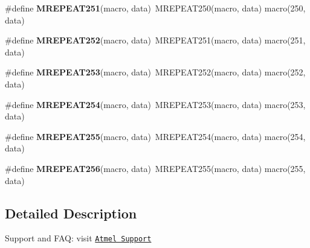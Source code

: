 \begin{DoxyCompactItemize}
\item 
\hypertarget{group__group__xmega__utils__mrepeat_ga1b24f68c1e46baf224a8d05207d768f4}{\#define {\bfseries M\-R\-E\-P\-E\-A\-T251}(macro, data)~M\-R\-E\-P\-E\-A\-T250(macro, data)   macro(250, data)}\label{group__group__xmega__utils__mrepeat_ga1b24f68c1e46baf224a8d05207d768f4}

\item 
\hypertarget{group__group__xmega__utils__mrepeat_ga83ac32e68c09ace0114ad0af4f39b7df}{\#define {\bfseries M\-R\-E\-P\-E\-A\-T252}(macro, data)~M\-R\-E\-P\-E\-A\-T251(macro, data)   macro(251, data)}\label{group__group__xmega__utils__mrepeat_ga83ac32e68c09ace0114ad0af4f39b7df}

\item 
\hypertarget{group__group__xmega__utils__mrepeat_gafbbb5e11ca1e4ca9c893de68c868a4cb}{\#define {\bfseries M\-R\-E\-P\-E\-A\-T253}(macro, data)~M\-R\-E\-P\-E\-A\-T252(macro, data)   macro(252, data)}\label{group__group__xmega__utils__mrepeat_gafbbb5e11ca1e4ca9c893de68c868a4cb}

\item 
\hypertarget{group__group__xmega__utils__mrepeat_gaf3e63914581123ee4c557b0c3b98003b}{\#define {\bfseries M\-R\-E\-P\-E\-A\-T254}(macro, data)~M\-R\-E\-P\-E\-A\-T253(macro, data)   macro(253, data)}\label{group__group__xmega__utils__mrepeat_gaf3e63914581123ee4c557b0c3b98003b}

\item 
\hypertarget{group__group__xmega__utils__mrepeat_ga9db19e5893568dfa7130030f09a45eba}{\#define {\bfseries M\-R\-E\-P\-E\-A\-T255}(macro, data)~M\-R\-E\-P\-E\-A\-T254(macro, data)   macro(254, data)}\label{group__group__xmega__utils__mrepeat_ga9db19e5893568dfa7130030f09a45eba}

\item 
\hypertarget{group__group__xmega__utils__mrepeat_gaa49bde8a3b34d9a86caf1c0397d5993f}{\#define {\bfseries M\-R\-E\-P\-E\-A\-T256}(macro, data)~M\-R\-E\-P\-E\-A\-T255(macro, data)   macro(255, data)}\label{group__group__xmega__utils__mrepeat_gaa49bde8a3b34d9a86caf1c0397d5993f}

\end{DoxyCompactItemize}


\subsection{Detailed Description}
Support and F\-A\-Q\-: visit \href{http://www.atmel.com/design-support/}{\tt Atmel Support} 

